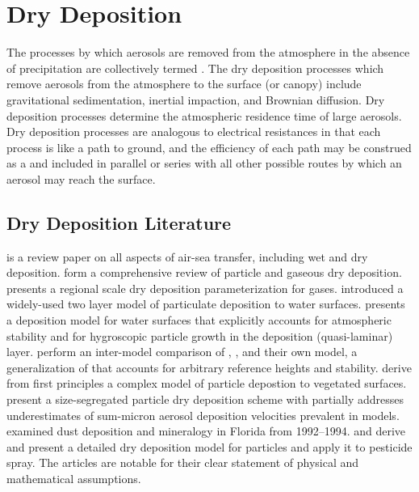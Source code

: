 \documentclass[12pt,twoside]{book}
\begin{document}
\chapter{Dry Deposition}\label{sxn:dry_dps}

The processes by which aerosols are removed from the atmosphere in the
absence of precipitation are collectively termed .
The dry deposition processes which remove aerosols from the atmosphere
to the surface (or canopy) include gravitational sedimentation, 
inertial impaction, and Brownian diffusion.
Dry deposition processes determine the atmospheric residence time of
large aerosols. 
Dry deposition processes are analogous to electrical resistances in
that each process is like a path to ground, and the efficiency of each
path may be construed as a  and included in
parallel or series with all other possible routes by which an aerosol
may reach the surface.

\section{Dry Deposition Literature}\label{sxn:ddp_ltr}

\cite{SHH78} is a review paper on all aspects of air-sea transfer,
including wet and dry deposition.
\cite{Seh80,Seh84} form a comprehensive review of particle and gaseous
dry deposition.
\cite{Wes89} presents a regional scale dry deposition parameterization
for gases.
\cite{SlS80} introduced a widely-used two layer model of particulate
deposition to water surfaces.
\cite{Wil82} presents a deposition model for water surfaces that
explicitly accounts for atmospheric stability and for hygroscopic
particle growth in the deposition (quasi-laminar) layer.
\cite{RVL93} perform an inter-model comparison of \cite{SlS80},
\cite{Wil82}, and their own model, a generalization of \cite{SlS80}
that accounts for arbitrary reference heights and stability.
\cite{PeE92} derive from first principles a complex model of particle
depostion to vegetated surfaces.
\cite{ZGP01} present a size-segregated particle dry deposition scheme 
with partially addresses underestimates of sum-micron aerosol
deposition velocities prevalent in models.
\cite{LPG95} examined dust deposition and mineralogy in Florida from
1992--1994. 
\cite{RBF01} and \cite{RBA01} derive and present a detailed dry
deposition model for particles and apply it to pesticide spray.
The articles are notable for their clear statement of physical and
mathematical assumptions. 
\end{document}

